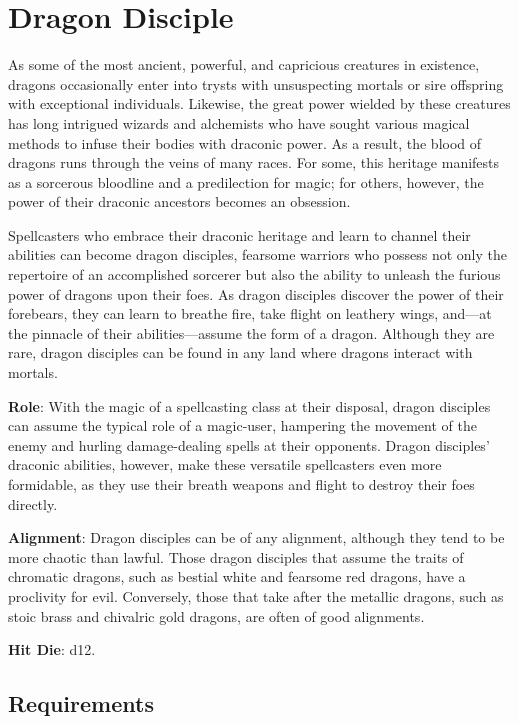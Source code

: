 \section{Dragon Disciple}

\label{f0}				
As some of the most ancient, powerful, and capricious creatures in existence, dragons occasionally enter into trysts with unsuspecting mortals or sire offspring with exceptional individuals. Likewise, the great power wielded by these creatures has long intrigued wizards and alchemists who have sought various magical methods to infuse their bodies with draconic power. As a result, the blood of dragons runs through the veins of many races. For some, this heritage manifests as a sorcerous bloodline and a predilection for magic; for others, however, the power of their draconic ancestors becomes an obsession.
				
Spellcasters who embrace their draconic heritage and learn to channel their abilities can become dragon disciples, fearsome warriors who possess not only the repertoire of an accomplished sorcerer but also the ability to unleash the furious power of dragons upon their foes. As dragon disciples discover the power of their forebears, they can learn to breathe fire, take flight on leathery wings, and---at the pinnacle of their abilities---assume the form of a dragon. Although they are rare, dragon disciples can be found in any land where dragons interact with mortals.
				
\textbf{Role}: With the magic of a spellcasting class at their disposal, dragon disciples can assume the typical role of a magic-user, hampering the movement of the enemy and hurling damage-dealing spells at their opponents. Dragon disciples' draconic abilities, however, make these versatile spellcasters even more formidable, as they use their breath weapons and flight to destroy their foes directly.
				
\textbf{Alignment}: Dragon disciples can be of any alignment, although they tend to be more chaotic than lawful. Those dragon disciples that assume the traits of chromatic dragons, such as bestial white and fearsome red dragons, have a proclivity for evil. Conversely, those that take after the metallic dragons, such as stoic brass and chivalric gold dragons, are often of good alignments.
				
\textbf{Hit Die}: d12.
				
\subsection{Requirements}

